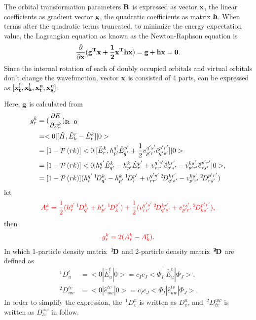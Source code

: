 \documentclass[a4paper,12pt,oneside]{book}
\newcommand{\red}[1]{{\color{red} #1}}
\newcommand{\perm}[1]{{\cal P}\left(#1\right)}
\newcommand{\pre}[1]{\,#1\!}
\begin{document}
The orbital transformation parameters $\bf{R}$ is expressed as vector $\bf{x}$, 
the linear coefficients as gradient vector $\bf{g}$, 
the quadratic coefficients as matrix $\bf{h}$. 
When terms after the quadratic terms truncated, 
to minimize the energy expectation value, the Lagrangian equation as known as the Newton-Raphson equation is
\begin{equation}
\frac{\partial}{\partial \bf{x}}(\bf{g}^T\bf{x}+\frac{1}{2}\bf{x}^T\bf{hx})= \bf{g}+\bf{hx} =0.
\end{equation}
Since the internal rotation of each of doubly occupied orbitals and virtual orbitals don't change the wavefunction, 
vector $\bf{x}$ is consisted of 4 parts, can be expressed as $[\bf{x}_t^j,\bf{x}_a^j,\bf{x}_t^u, \bf{x}_a^u]$.

Here, $\bf{g}$ is calculated from
\begin{equation}
\begin{aligned}
  g_r^k&= (\frac{\partial E}{\partial x_r^k})_{\bf{R = \bf{0}}}\\
  &= <0|[\hat{H}, \hat{E}^r_k-\hat{E}^k_r]|0>\\
  &= [1-\perm{rk}]<0|[\hat{E}^k_r, h^{q'}_{p'}\hat{E}^{p'}_{q'} + \frac{1}{2}v^{q's'}_{p'r'}\hat{e}^{p'r'}_{q's'}]|0>\\
  &= [1-\perm{rk}]<0|h^{q'}_r\hat{E}^k_{q'}-h^k_{p'}\hat{E}^{p'}_r +v^{q's'}_{rr'}\hat{e}^{kr'}_{q's'}- v^{ks'}_{p'r'}\hat{e}^{p'r'}_{rs'}|0>,\\
  &= [1-\perm{rk}](h^{q'}_r\pre{^1}D^k_{q'}-h^k_{p'}\pre{^1}D^{p'}_r+v^{q's'}_{rr'}\pre{^2}D^{kr'}_{q's'}-v^{ks'}_{p'r'}\pre{^2}D^{p'r'}_{rs'})
\end{aligned}
\end{equation}
let
\begin{equation}
  \red{A_r^k= \frac{1}{2}(h^{q'}_r\pre{^1}D^k_{q'} + h^r_{p'}\pre{^1}D^{p'}_k) + \frac{1}{2}(v^{q's'}_{rr'}\pre{^2}D^{kr'}_{q's'}+v^{rs'}_{p'r'}\pre{^2}D^{p'r'}_{ks'}),}
\end{equation}
then
\begin{equation}
  \red{g_r^k = 2(A_r^k-A_k^r).}
\end{equation}
In which 1-particle density matrix $\bf{\pre{^1}D}$ and 2-particle density matrix $\bf{\pre{^2}D}$ are defined as 
\begin{equation}
\begin{aligned}
  \pre{^1}D^t_u &= <0|\hat{E}^t_u|0> = c_Ic_J<\Phi_I|\hat{E}^t_u|\Phi_J>,\\
  \pre{^2}D^{tv}_{uw} &= <0|\hat{e}^{tv}_{uw}|0> = c_Ic_J<\Phi_I|\hat{e}^{tv}_{uw}|\Phi_J>.
\end{aligned}
\end{equation}
In order to simplify the expression, 
the $\pre{^1}D_v^u$ is written as $D_v^u$, and $\pre{^2}D_{tv}^{uw}$ is written as $D_{tv}^{uw}$ in follow. 
\end{document}
